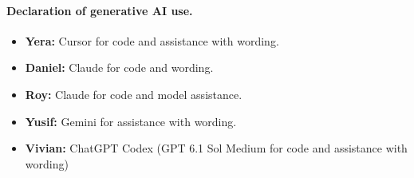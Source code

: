 \documentclass[11pt,a4paper]{article}
\begin{document}
\paragraph{Declaration of generative AI use.}
\begin{itemize}
\item \textbf{Yera:} Cursor for code and assistance with wording.
\item \textbf{Daniel:} Claude for code and wording.
\item \textbf{Roy:} Claude for code and model assistance.
\item \textbf{Yusif:} Gemini for assistance with wording.
\item \textbf{Vivian:} ChatGPT Codex (GPT 6.1 Sol Medium for code and assistance with wording)
\end{itemize}
\end{document}
